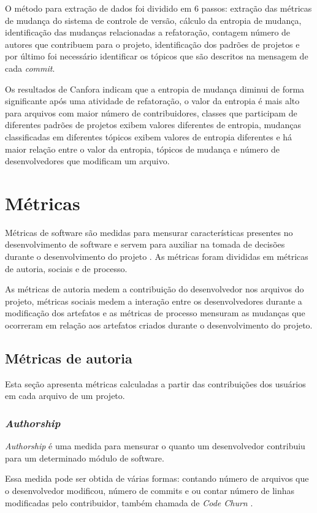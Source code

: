 O método para extração de dados foi dividido em 6 passos: extração das métricas de mudança do sistema de controle de versão, cálculo da entropia de mudança, identificação das mudanças relacionadas a refatoração, contagem número de autores que contribuem para o projeto, identificação dos padrões de projetos e por último foi necessário identificar os tópicos que são descritos na mensagem de cada \textit{commit}. 

Os resultados de Canfora indicam que a entropia de mudança diminui de forma significante após uma atividade de refatoração, o valor da entropia é mais alto para arquivos com maior número de contribuidores, classes que participam de diferentes padrões de projetos exibem valores diferentes de entropia, mudanças classificadas em diferentes tópicos exibem valores de entropia diferentes e há maior relação entre o valor da entropia, tópicos de mudança e número de desenvolvedores que modificam um arquivo. 

\section{Métricas}
Métricas de software são medidas para mensurar características presentes no desenvolvimento de software e servem para auxiliar na tomada de decisões durante o desenvolvimento do projeto \cite{koscianski2007qualidade}. As métricas foram divididas em métricas de autoria, sociais e de processo. 

As métricas de autoria medem a contribuição do desenvolvedor nos arquivos do projeto, métricas sociais medem a interação entre os desenvolvedores durante a modificação dos artefatos e as métricas de processo mensuram as mudanças que ocorreram em relação aos artefatos criados durante o desenvolvimento do projeto.

\subsection{Métricas de autoria}
Esta seção apresenta métricas calculadas a partir das contribuições dos usuários em cada arquivo de um projeto.

\subsubsection{\textit{Authorship}}
\textit{Authorship} é uma medida para mensurar o quanto um desenvolvedor contribuiu para um determinado módulo de software.

Essa medida pode ser obtida de várias formas: contando número de arquivos que o desenvolvedor modificou, número de commits e ou contar número de linhas modificadas pelo contribuidor, também chamada de \textit{Code Churn} \cite{Munson:1998:CCM:850947.853326}.


